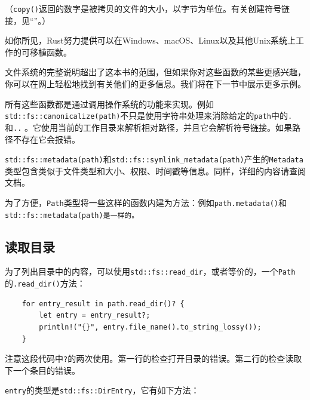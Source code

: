 （\texttt{copy()}返回的数字是被拷贝的文件的大小，以字节为单位。有关创建符号链接，见“”。）

如你所见，Rust努力提供可以在Windows、macOS、Linux以及其他Unix系统上工作的可移植函数。

文件系统的完整说明超出了这本书的范围，但如果你对这些函数的某些更感兴趣，你可以在网上轻松地找到有关他们的更多信息。我们将在下一节中展示更多示例。

所有这些函数都是通过调用操作系统的功能来实现。例如\texttt{std::fs::canonicalize(path)}不只是使用字符串处理来消除给定的\texttt{path}中的\texttt{.}和\texttt{..} 。它使用当前的工作目录来解析相对路径，并且它会解析符号链接。如果路径不存在它会报错。

\texttt{std::fs::metadata(path)}和\texttt{std::fs::symlink\_metadata(path)}产生的\texttt{Metadata}类型包含类似于文件类型和大小、权限、时间戳等信息。同样，详细的内容请查阅文档。

为了方便，\texttt{Path}类型将一些这样的函数内建为方法：例如\texttt{path.metadata()}和\texttt{std::fs::metadata(path)是一样的。}

\subsection{读取目录}
为了列出目录中的内容，可以使用\texttt{std::fs::read\_dir}，或者等价的，一个\texttt{Path}的\texttt{.read\_dir()}方法：
\begin{verbatim}
    for entry_result in path.read_dir()? {
        let entry = entry_result?;
        println!("{}", entry.file_name().to_string_lossy());
    }
\end{verbatim}

注意这段代码中\texttt{?}的两次使用。第一行的检查打开目录的错误。第二行的检查读取下一个条目的错误。

\texttt{entry}的类型是\texttt{std::fs::DirEntry}，它有如下方法：



